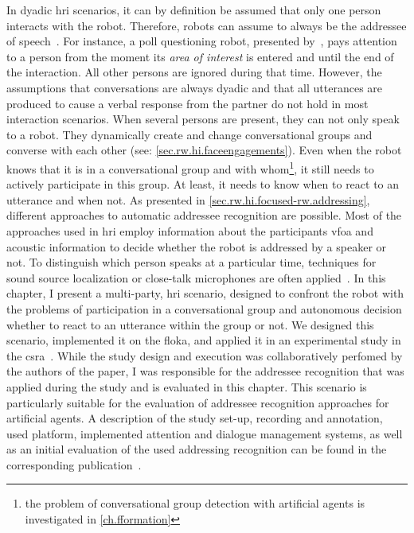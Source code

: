 In dyadic \gls{hri} scenarios, it can by definition be assumed that only one person interacts with the \gls{robot}.
Therefore, \glspl{robot} can assume to always be the \gls{addressee} of speech~\cite{Holthaus,Carlmeyer2014,Huang2016}.
For instance, a poll questioning \gls{robot}, presented by~, pays attention to a person from the moment its \emph{area of interest} is entered and until the end of the interaction.
All other persons are ignored during that time.
However, the assumptions that \glspl{conversation} are always dyadic and that all utterances are produced to cause a verbal response from the  partner do not hold in most interaction scenarios.
When several persons are present, they can not only speak to a \gls{robot}.
They dynamically create and change \glspl{conversational group} and converse with each other (see: \cref{sec.rw.hi.faceengagements}).
Even when the \gls{robot} knows that it is in a \gls{conversational group} and with whom\footnote{the problem of {conversational group} detection with \glspl{artificial agent} is investigated in \cref{ch.fformation}}, it still needs to actively participate in this group.
At least, it needs to know when to react to an utterance and when not.
As presented in \cref{sec.rw.hi.focused-rw.addressing}, different approaches to automatic \gls{addressee} recognition are possible.
Most of the approaches used in \gls{hri} employ information about the participants \gls{vfoa} and acoustic information to decide whether the \gls{robot} is addressed by a \gls{speaker} or not.
To distinguish which person speaks at a particular time, techniques for sound source localization or close-talk microphones are often applied~\cite{Lang2003,Skantze2014}.
In this chapter, I present a multi-party, \acrlong{hri} scenario, designed to confront the \gls{robot} with the problems of participation in a \gls{conversational group} and autonomous decision whether to react to an utterance within the group or not.
We designed this scenario, implemented it on the \gls{floka}, and applied it in an experimental study in the \gls{csra}~\cite{Richter}.
While the study design and execution was collaboratively perfomed by the authors of the paper, I was responsible for the addressee recognition that was applied during the study and is evaluated in this chapter.
This scenario is particularly suitable for the evaluation of \gls{addressee} recognition approaches for \glspl{artificial agent}.
A description of the study set-up, recording and annotation, used platform, implemented attention and dialogue management systems, as well as an initial evaluation of the used addressing recognition can be found in the corresponding publication~\cite{Richter}.
